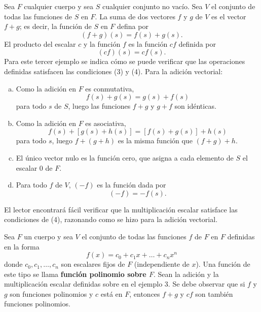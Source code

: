 \begin{ejem}
    Sea $F$ cualquier cuerpo y sea $S$ cualquier conjunto no vacío. Sea $V$ el conjunto de todas las funciones de $S$ en $F$. La suma de dos vectores $f$ y $g$ de $V$ es el vector $f+g$; es decir, la función de $S$ en $F$ defina por
    \begin{equation}
	(f+g)(s)=f(s)+g(s).
    \end{equation}
    El producto del escalar $c$ y la función $f$ es la función $cf$ definida por
    \begin{equation}
	(cf)(s)=cf(s).
    \end{equation}
    Para este tercer ejemplo se indica cómo se puede verificar que las operaciones definidas satisfacen las condiciones (3) y (4). Para la adición vectorial:
    \begin{enumerate}[(a)]
	\item Como la adición en $F$ es conmutativa,
	    $$f(s)+g(s)=g(s)+f(s)$$
	    para todo $s$ de $S$, luego las funciones $f+g$ y $g+f$ son idénticas.
	\item Como la adición en $F$ es asociativa,
	    $$f(s)+[g(s)+h(s)]=[f(s)+g(s)]+h(s)$$
	    para todo $s$, luego $f+(g+h)$ es la misma función que $(f+g)+h.$
	\item El único vector nulo es la función cero, que asigna a cada elemento de $S$ el escalar $0$ de $F$.
	\item Para todo $f$ de $V$, $(-f)$ es la función dada por
	    $$(-f)=-f(s).$$
    \end{enumerate}
    El lector encontrará fácil verificar que la multiplicación escalar satisface las condiciones de (4), razonando como se hizo para la adición vectorial.

\end{ejem}

\begin{ejem} Sea $F$ un cuerpo y sea $V$ el conjunto de todas las funciones $f$ de $F$ en $F$ definidas en la forma
    \begin{equation}
	f(x)=c_0+c_1x+\ldots + c_n x^n
    \end{equation}
    donde $c_0,c_1,\ldots , c_n$ son escalares fijos de $F$ (independiente de $x$). Una función de este tipo se llama \textbf{\boldmath función polinomio sobre $F$}. Sean la adición y la multiplicación escalar definidas sobre en el ejemplo 3. Se debe observar que si $f$ y $g$ son funciones polinomios y $c$ está en $F$, entonces $f+g$ y $cf$ son también funciones polinomios.
\end{ejem}

